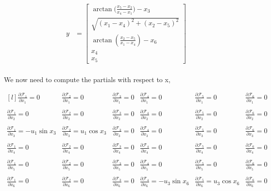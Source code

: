 \documentclass[paper=a4, fontsize=11pt]{scrartcl} %
\numberwithin{equation}{section} %
\numberwithin{figure}{section} %
\numberwithin{table}{section} %
\begin{document}
\begin{framed}
\begin{align*}
  y &= \begin{bmatrix} \arctan{(\frac{x_5 - x_2}{x_4 - x_1}}) - x_3   \\ 
                \sqrt{ (x_1 - x_4)^2 + (x_2 - x_5)^2}  \\
                \arctan{(\frac{x_2 - x_5}{x_1 - x_4})} - x_6 \\
                x_4 \\
                x_5
  \end{bmatrix}  \\
\end{align*}

We now need to compute the partials with respect to x,

\[ \begin{matrix*}[l]
\frac{\partial\mathcal{F}_1}{\partial x_1} = 0 &
\frac{\partial\mathcal{F}_2}{\partial x_1} = 0 & 
\frac{\partial\mathcal{F}_3}{\partial x_1} = 0 & 
\frac{\partial\mathcal{F}_4}{\partial x_1} = 0 & 
\frac{\partial\mathcal{F}_5}{\partial x_1} = 0 &  
\frac{\partial\mathcal{F}_6}{\partial x_1} = 0 & \\ \\
\frac{\partial\mathcal{F}_1}{\partial x_2} = 0 &
\frac{\partial\mathcal{F}_2}{\partial x_2} = 0 & 
\frac{\partial\mathcal{F}_3}{\partial x_2} = 0 & 
\frac{\partial\mathcal{F}_4}{\partial x_2} = 0 & 
\frac{\partial\mathcal{F}_5}{\partial x_2} = 0 &  
\frac{\partial\mathcal{F}_6}{\partial x_2} = 0 & \\ \\
\frac{\partial\mathcal{F}_1}{\partial x_3} = -u_1\sin{x_3} &
\frac{\partial\mathcal{F}_2}{\partial x_3} = u_1\cos{x_3} & 
\frac{\partial\mathcal{F}_3}{\partial x_3} = 0 & 
\frac{\partial\mathcal{F}_4}{\partial x_3} = 0 & 
\frac{\partial\mathcal{F}_5}{\partial x_3} = 0 &  
\frac{\partial\mathcal{F}_6}{\partial x_3} = 0 & \\ \\
\frac{\partial\mathcal{F}_1}{\partial x_4} = 0 &
\frac{\partial\mathcal{F}_2}{\partial x_4} = 0 & 
\frac{\partial\mathcal{F}_3}{\partial x_4} = 0 & 
\frac{\partial\mathcal{F}_4}{\partial x_4} = 0 & 
\frac{\partial\mathcal{F}_5}{\partial x_4} = 0 &  
\frac{\partial\mathcal{F}_6}{\partial x_4} = 0 & \\ \\
\frac{\partial\mathcal{F}_1}{\partial x_5} = 0 &
\frac{\partial\mathcal{F}_2}{\partial x_5} = 0 & 
\frac{\partial\mathcal{F}_3}{\partial x_5} = 0 & 
\frac{\partial\mathcal{F}_4}{\partial x_5} = 0 & 
\frac{\partial\mathcal{F}_5}{\partial x_5} = 0 &  
\frac{\partial\mathcal{F}_6}{\partial x_5} = 0 & \\ \\
\frac{\partial\mathcal{F}_1}{\partial x_6} = 0 &
\frac{\partial\mathcal{F}_2}{\partial x_6} = 0 & 
\frac{\partial\mathcal{F}_3}{\partial x_6} = 0 & 
\frac{\partial\mathcal{F}_4}{\partial x_6} = -u_3\sin{x_6} & 
\frac{\partial\mathcal{F}_5}{\partial x_6} = u_3\cos{x_6} &  
\frac{\partial\mathcal{F}_6}{\partial x_6} = 0 & \\ \\
\end{matrix*}\]


\end{framed}
\end{document}
